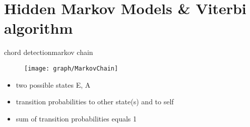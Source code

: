     \section[HMMs]{Hidden Markov Models \& Viterbi algorithm}
        \begin{frame}{chord detection}{markov chain}
            \begin{figure}
                \centering
                    \texttt{[image: graph/MarkovChain]}
            \end{figure}
            \begin{itemize}
                \item   two possible states E, A
                \item   transition probabilities to other state(s) and to self
                \item   sum of transition probabilities equals 1
            \end{itemize}
        \end{frame}
        
